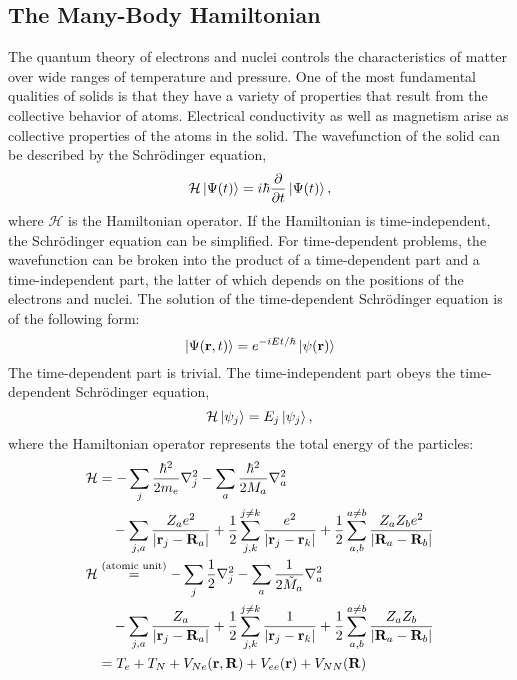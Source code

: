 \subsection{The Many-Body Hamiltonian}
The quantum theory of electrons and nuclei controls the characteristics of matter over wide ranges of temperature and pressure. One of the most fundamental qualities of solids is that they have a variety of properties that result from the collective behavior of atoms. Electrical conductivity as well as magnetism arise as collective properties of the atoms in the solid. The wavefunction of the solid can be described by the Schr\"odinger equation,
\begin{equation}
	\mathcal{H}\ket{\Psi(t)} = i\hbar  \frac{\partial}{\partial t}\ket{\Psi(t)},
\end{equation}
where $\mathcal{H}$ is the Hamiltonian operator. If the Hamiltonian is time-independent, the Schr\"odinger equation can be simplified. For time-dependent problems, the wavefunction can be broken into the product of a time-dependent part and a time-independent part, the latter of which depends on the positions of the electrons and nuclei. The solution of the time-dependent Schr\"odinger equation is of the following form:\footnotemark
{} 
\begin{equation}
\ket{\Psi(\vb{r},t)} = e^{-iEt/\hbar}\ket{\psi(\vb{r})}
\end{equation}
The time-dependent part is trivial. The time-independent part obeys the time-dependent Schr\"odinger equation,
\begin{equation}\label{sheqn}
	\mathcal{H}\ket{\psi_j} = E_j\ket{\psi_j},
\end{equation}
where the Hamiltonian operator represents the total energy of the particles:
\begin{align}\label{hameqn}
 \mathcal{H} &= -\sum_j \frac{\hbar^2}{2m_e}\nabla^2_j - \sum_a \frac{\hbar^2}{2M_a}\nabla^2_a \nonumber \\
			& \quad -\sum_{j,a}\frac{Z_ae^2}{\abs{\vb{r}_j-\vb{R}_a}} + \frac{1}{2}\sum_{j,k}^{j\neq k} \frac{e^2}{\abs{\vb{r}_j - \vb{r}_k}} + \frac{1}{2}\sum_{a,b}^{a\neq b} \frac{Z_aZ_be^2}{\abs{\vb{R}_a - \vb{R}_b}} \nonumber \\
 \mathcal{H} & \stackrel{\text{(atomic unit)}}{=} -\sum_j\frac{1}{2}\nabla^2_j - \sum_a\frac{1}{2\tilde{M}_a}\nabla_a^2 \nonumber \\
			& \quad -\sum_{j,a}\frac{Z_a}{\abs{\vb{r}_j - \vb{R}_a}} + \frac{1}{2}\sum_{j,k}^{j\neq k} \frac{1}{\abs{\vb{r}_j-\vb{r}_k}} + \frac{1}{2}\sum_{a,b}^{a\neq b} \frac{Z_aZ_b}{\abs{\vb{R}_a - \vb{R}_b}} \nonumber \\
   & = T_e + T_N + V_{Ne}(\vb{r},\vb{R}) + V_{ee}(\vb{r}) + V_{NN}(\vb{R}) 
\end{align}

